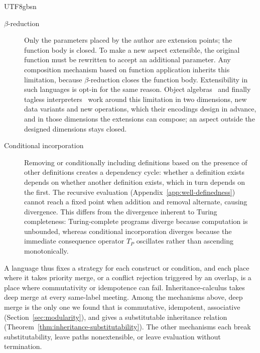 \begin{CJK*}{UTF8}{gbsn}
\begin{description}
  \item[$\beta$-reduction]
    Only the parameters placed by the author are extension
    points; the function body is closed.
    To make a new aspect extensible, the original function must
    be rewritten to accept an additional parameter.
    Any composition mechanism based on function application
    inherits this limitation, because $\beta$-reduction
    closes the function body.
    Extensibility in such languages is opt-in for the same reason.
    Object algebras~\cite{oliveira2012-object-algebras} and finally
    tagless interpreters~\cite{carette2009-finally-tagless} work around
    this limitation in two dimensions, new data variants and new
    operations, which their encodings design in advance, and in those
    dimensions the extensions can compose; an aspect outside the
    designed dimensions stays closed.

  \item[Conditional incorporation]
    Removing or conditionally including definitions
    based on the presence of other definitions
    creates a dependency cycle:
    whether a definition exists depends on
    whether another definition exists, which in turn
    depends on the first.
    The recursive evaluation
    (Appendix~\ref{app:well-definedness}) cannot
    reach a fixed point when addition and removal
    alternate, causing divergence.
    This differs from the divergence inherent to
    Turing completeness: Turing-complete programs
    diverge because computation is unbounded, whereas
    conditional incorporation diverges because the
    immediate consequence operator $T_P$ oscillates
    rather than ascending monotonically.
\end{description}

\noindent
A language thus fixes a strategy for each construct or condition,
and each place where it takes priority merge, or a conflict
rejection triggered by an overlap, is a place where commutativity
or idempotence can fail.
Inheritance-calculus takes deep merge at every same-label meeting.
Among the mechanisms above, deep merge is the only one we found
that is commutative, idempotent, associative
(Section~\ref{sec:modularity}), and
gives a substitutable inheritance relation
(Theorem~\ref{thm:inheritance-substitutability}).
The other mechanisms each break substitutability, leave paths
nonextensible, or leave evaluation without termination.


\end{CJK*}
